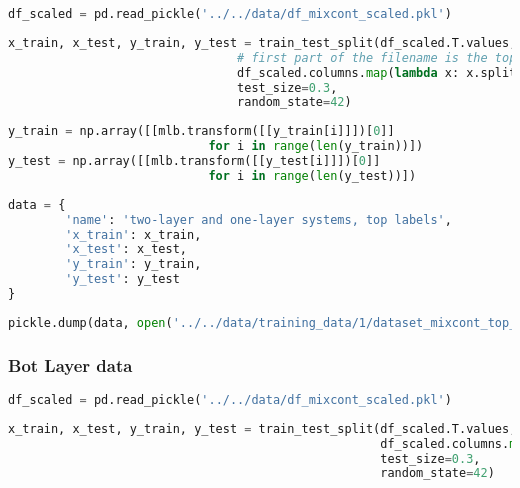 \begin{lstlisting}[language=Python]
df_scaled = pd.read_pickle('../../data/df_mixcont_scaled.pkl')
\end{lstlisting}

\begin{lstlisting}[language=Python]
x_train, x_test, y_train, y_test = train_test_split(df_scaled.T.values,
                                # first part of the filename is the top label
                                df_scaled.columns.map(lambda x: x.split('_')[0]), 
                                test_size=0.3,
                                random_state=42)
\end{lstlisting}

\begin{lstlisting}[language=Python]
y_train = np.array([[mlb.transform([[y_train[i]]])[0]] 
                            for i in range(len(y_train))])
y_test = np.array([[mlb.transform([[y_test[i]]])[0]] 
                            for i in range(len(y_test))])
\end{lstlisting}

\begin{lstlisting}[language=Python]
data = {
        'name': 'two-layer and one-layer systems, top labels',
        'x_train': x_train,
        'x_test': x_test,
        'y_train': y_train,
        'y_test': y_test
}
\end{lstlisting}

\begin{lstlisting}[language=Python]
pickle.dump(data, open('../../data/training_data/1/dataset_mixcont_top_layer.pkl', 'wb'))
\end{lstlisting}

\hypertarget{bot-layer-data}{%
\subsubsection{Bot Layer data}\label{bot-layer-data}}

\begin{lstlisting}[language=Python]
df_scaled = pd.read_pickle('../../data/df_mixcont_scaled.pkl')
\end{lstlisting}

\begin{lstlisting}[language=Python]
x_train, x_test, y_train, y_test = train_test_split(df_scaled.T.values,
                                                    df_scaled.columns.map(lambda x: x.split('_')[1]), # second part of the filename is the bot label
                                                    test_size=0.3,
                                                    random_state=42)
\end{lstlisting}

